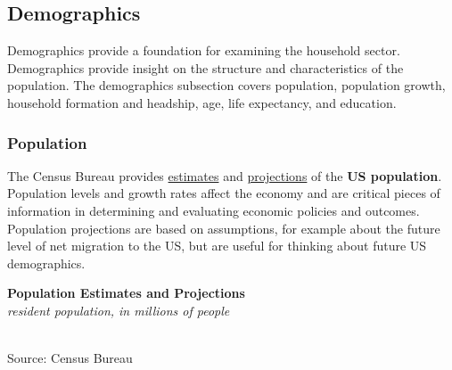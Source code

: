 \documentclass{report}
\makeatletter
\newcommand{\tbllink}[1]{\href{https://raw.githubusercontent.com/bdecon/US-chartbook/master/chartbook/data/#1}{\faTable}}
\newcommand*\short[1]{\expandafter\@gobbletwo\number\numexpr#1\relax}
\newcommand{\absnode}[3]{\node[below right, align=left] at (axis cs: #1,#2) {#3};}
\newcommand{\dateaxisticks}{
		date coordinates in=x, axis line style={draw=none},
		xmax={2023-10-01},
		max space between ticks=40,	    
		xtick={{1990-01-01}, {1992-01-01}, {1994-01-01}, 
			{1996-01-01}, {1998-01-01}, {2000-01-01}, 
			{2002-01-01}, {2004-01-01}, {2006-01-01},
			{2008-01-01}, {2010-01-01}, {2012-01-01}, {2014-01-01},
		    {2016-01-01}, {2018-01-01}, {2020-01-01}, {2022-01-01}, 
		    {2024-01-01}, {2026-01-01}},
		minor xtick={{1989-01-01}, {1991-01-01}, {1993-01-01},
			{1995-01-01}, {1997-01-01}, {1999-01-01}, 
			{2001-01-01}, {2003-01-01}, {2005-01-01}, {2007-01-01},
		    {2009-01-01}, {2011-01-01}, {2013-01-01}, {2015-01-01},
		    {2017-01-01}, {2019-01-01}, {2021-01-01}, {2023-01-01}, 
		    {2025-01-01}, {2027-01-01}},
		enlarge y limits={0.06}, enlarge x limits={0.01},
		}
\newcommand{\bbar}[2]{extra #1 ticks = {{#2}}, extra #1 tick labels = ,
		extra #1 tick style = {grid=major, grid style={thick, black!25}},}
\newcommand{\thickline}[4]{\addplot[ultra thick, no markers, color=#1] 
		table [x=#2, y=#3, col sep=comma] {#4};	}
\newcommand{\rbars}{
		\fill[color=black!10] (axis cs:{1990-07-01},\pgfkeysvalueof{/pgfplots/ymin}) rectangle 
			(axis cs:{1991-03-01}, \pgfkeysvalueof{/pgfplots/ymax});
		\fill[color=black!10] (axis cs:{2007-12-01},\pgfkeysvalueof{/pgfplots/ymin}) rectangle 
			(axis cs:{2009-07-01}, \pgfkeysvalueof{/pgfplots/ymax});
		\fill[color=black!10] (axis cs:{2001-03-01},\pgfkeysvalueof{/pgfplots/ymin}) rectangle 
			(axis cs:{2001-11-01}, \pgfkeysvalueof{/pgfplots/ymax});
		\fill[color=black!10] (axis cs:{2020-02-01},\pgfkeysvalueof{/pgfplots/ymin}) rectangle 
			(axis cs:{2020-05-01}, \pgfkeysvalueof{/pgfplots/ymax});}
\makeatother
\begin{document}
{\begin{minipage}{0.76\textwidth}
\hypertarget{hhdem}{\label{hhdem}}
\subsection*{Demographics}
\vspace{-1.0mm}

\small Demographics provide a foundation for examining the household sector. Demographics provide insight on the structure and characteristics of the population. The demographics subsection covers population, population growth, household formation and headship, age, life expectancy, and education.

\subsubsection*{Population}
\small The Census Bureau provides \href{https://www.census.gov/programs-surveys/popest.html}{estimates} and \href{https://www.census.gov/programs-surveys/popproj.html}{projections} of the \textbf{US population}. Population levels and growth rates affect the economy and are critical pieces of information in determining and evaluating economic policies and outcomes. Population projections are based on assumptions, for example about the future level of net migration to the US, but are useful for thinking about future US demographics.


\vspace{1mm}

\normalsize \textbf{Population Estimates and Projections}\\
\footnotesize{\textit{resident population, in millions of people}}\\
\hspace*{-2mm} \\
\footnotesize{Source: Census Bureau} \hfill \tbllink{pop_est.csv}
\vspace{2mm}


\end{minipage}}
\end{document}
